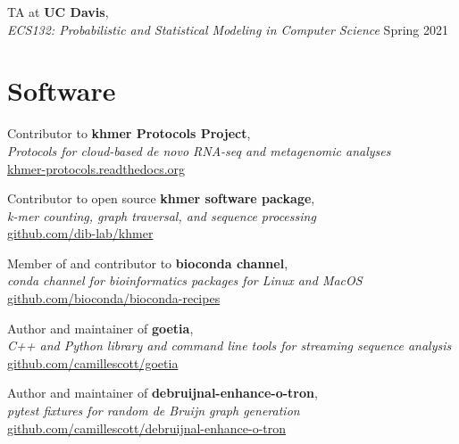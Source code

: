 \documentclass[margin,12pt]{camille_resume}
\begin{document}
\begin{resume}
\begin{list1}
\item[] TA at {\bf UC Davis},\\
{\em ECS132: Probabilistic and Statistical Modeling in Computer Science} \hfill Spring 2021\\

\end{list1}

\pagebreak

    \section{\mysidestyle Software}

\begin{list1}

\item[] Contributor to {\bf khmer Protocols Project},\\
{\em Protocols for cloud-based de novo RNA-seq and metagenomic analyses}\\
\hfill \href{https://khmer-protocols.readthedocs.org/}{khmer-protocols.readthedocs.org}\\

\item[] Contributor to open source {\bf khmer software package},\\ 
{\em k-mer counting, graph traversal, and sequence processing}\\
\hfill \href{https://github.com/ged-lab/khmer/}{github.com/dib-lab/khmer}\\

\item[] Member of and contributor to {\bf bioconda channel},\\
{\em conda channel for bioinformatics packages for Linux and MacOS}\\
\hfill \href{https://github.com/bioconda/bioconda-recipes}{github.com/bioconda/bioconda-recipes}\\

\item[] Author and maintainer of {\bf goetia},\\
{\em C++ and Python library and command line tools for streaming sequence analysis}\\
\hfill \href{https://github.com/camillescott/goetia}{github.com/camillescott/goetia}\\

\item[] Author and maintainer of {\bf debruijnal-enhance-o-tron},\\
{\em pytest fixtures for random de Bruijn graph generation}\\
\hfill \href{https://github.com/camillescott/debruijnal-enhance-o-tron}{github.com/camillescott/debruijnal-enhance-o-tron}\\


\end{list1}
\end{resume}
\end{document}
